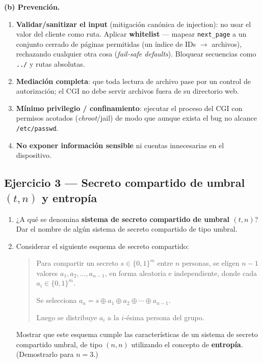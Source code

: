 \textbf{(b) Prevención.}
\begin{enumerate}[leftmargin=1.9em,itemsep=2pt]
  \item \textbf{Validar/sanitizar el input} (mitigación canónica de injection): no usar el valor
        del cliente como ruta. Aplicar \textbf{whitelist} --- mapear \texttt{next\_page} a un
        conjunto cerrado de páginas permitidas (un índice de IDs $\to$ archivos), rechazando
        cualquier otra cosa (\emph{fail-safe defaults}). Bloquear secuencias como \texttt{../} y
        rutas absolutas.
  \item \textbf{Mediación completa}: que toda lectura de archivo pase por un control de
        autorización; el CGI no debe servir archivos fuera de su directorio web.
  \item \textbf{Mínimo privilegio / confinamiento}: ejecutar el proceso del CGI con permisos
        acotados (\emph{chroot}/jail) de modo que aunque exista el bug no alcance
        \texttt{/etc/passwd}.
  \item \textbf{No exponer información sensible} ni cuentas innecesarias en el dispositivo.
\end{enumerate}

\subsection{Ejercicio 3 — Secreto compartido de umbral $(t,n)$ y entropía}

\begin{consigna}
\begin{enumerate}[label=\arabic*)]
  \item ¿A qué se denomina \textbf{sistema de secreto compartido de umbral $(t,n)$}? Dar el
        nombre de algún sistema de secreto compartido de tipo umbral.
  \item Considerar el siguiente esquema de secreto compartido:

  \begin{quote}
  Para compartir un secreto $s \in \{0,1\}^m$ entre $n$ personas, se eligen $n-1$ valores
  $a_1, a_2, \ldots, a_{n-1}$, en forma aleatoria e independiente, donde cada
  $a_i \in \{0,1\}^m$.

  Se selecciona $a_n = s \oplus a_1 \oplus a_2 \oplus \cdots \oplus a_{n-1}$.

  Luego se distribuye $a_i$ a la $i$-ésima persona del grupo.
  \end{quote}

  Mostrar que este esquema cumple las características de un sistema de secreto compartido umbral,
  de tipo $(n,n)$ utilizando el concepto de \textbf{entropía}. (Demostrarlo para $n = 3$.)
\end{enumerate}
\end{consigna}

